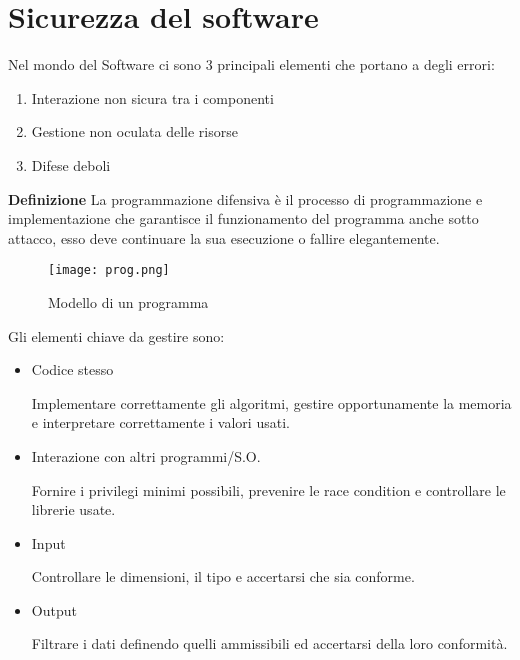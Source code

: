 \documentclass{article}
\newcommand{\df}[1]{\noindent\textbf{Definizione } #1.\newline}
\begin{document}
\newpage

\vspace*{-3\baselineskip}

\section{Sicurezza del software}

Nel mondo del Software ci sono 3 principali elementi che portano a degli errori:
\begin{enumerate}
    \item Interazione non sicura tra i componenti
    \item Gestione non oculata delle risorse
    \item Difese deboli\newline
\end{enumerate}

\df{La programmazione difensiva è il processo di programmazione e implementazione che garantisce il funzionamento del programma anche sotto attacco, esso deve continuare la sua esecuzione o fallire elegantemente}

\begin{figure}[ht]
    \centering
    \texttt{[image: prog.png]}
    \caption{Modello di un programma}
\end{figure}

\noindent Gli elementi chiave da gestire sono:
\begin{itemize}
    \item Codice stesso
    
        Implementare correttamente gli algoritmi, gestire opportunamente la memoria e interpretare correttamente i valori usati.
    
    \item Interazione con altri programmi/S.O.

        Fornire i privilegi minimi possibili, prevenire le race condition e controllare le librerie usate.
    
    \item Input

        Controllare le dimensioni, il tipo e accertarsi che sia conforme.
    
    \item Output

        Filtrare i dati definendo quelli ammissibili ed accertarsi della loro conformità.
    
\end{itemize}
\end{document}
